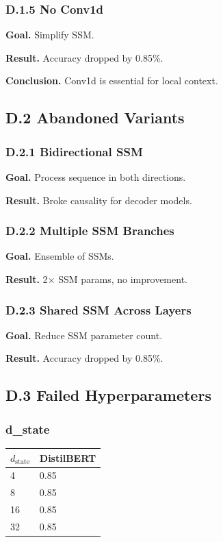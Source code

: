 \subsubsection{D.1.5 No Conv1d}

\textbf{Goal.} Simplify SSM.

\textbf{Result.} Accuracy dropped by 0.85\%.

\textbf{Conclusion.} Conv1d is essential for local context.

\subsection{D.2 Abandoned Variants}

\subsubsection{D.2.1 Bidirectional SSM}

\textbf{Goal.} Process sequence in both directions.

\textbf{Result.} Broke causality for decoder models.

\subsubsection{D.2.2 Multiple SSM Branches}

\textbf{Goal.} Ensemble of SSMs.

\textbf{Result.} 2$\times$ SSM params, no improvement.

\subsubsection{D.2.3 Shared SSM Across Layers}

\textbf{Goal.} Reduce SSM parameter count.

\textbf{Result.} Accuracy dropped by 0.85\%.

\subsection{D.3 Failed Hyperparameters}

\subsubsection{d\_state}

\begin{table}[H]
\centering
\small
\begin{tabular}{ll}
\toprule
\textbf{$d_\text{state}$} & \textbf{DistilBERT} \\
\midrule
4 & 0.85 \\
8 & 0.85 \\
16 & 0.85 \\
32 & 0.85 \\
\bottomrule
\end{tabular}
\end{table}

